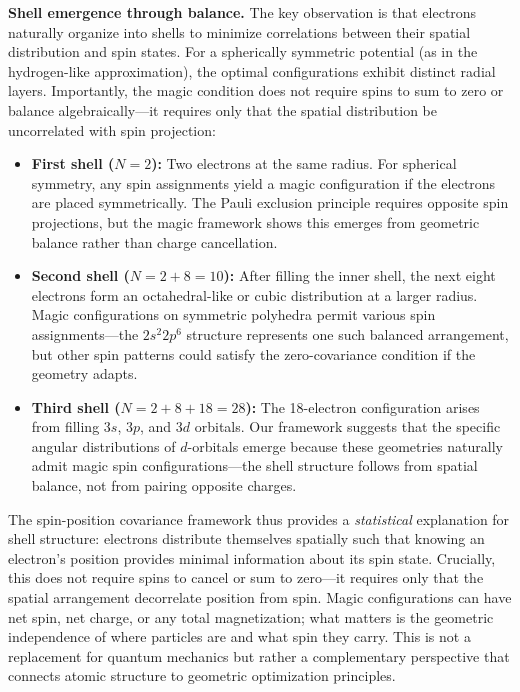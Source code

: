 \textbf{Shell emergence through balance.} The key observation is that electrons naturally organize into shells to minimize correlations between their spatial distribution and spin states. For a spherically symmetric potential (as in the hydrogen-like approximation), the optimal configurations exhibit distinct radial layers. Importantly, the magic condition does not require spins to sum to zero or balance algebraically---it requires only that the spatial distribution be uncorrelated with spin projection:

\begin{itemize}
\item \textbf{First shell ($N = 2$):} Two electrons at the same radius. For spherical symmetry, any spin assignments yield a magic configuration if the electrons are placed symmetrically. The Pauli exclusion principle requires opposite spin projections, but the magic framework shows this emerges from geometric balance rather than charge cancellation.

\item \textbf{Second shell ($N = 2 + 8 = 10$):} After filling the inner shell, the next eight electrons form an octahedral-like or cubic distribution at a larger radius. Magic configurations on symmetric polyhedra permit various spin assignments---the $2s^2 2p^6$ structure represents one such balanced arrangement, but other spin patterns could satisfy the zero-covariance condition if the geometry adapts.

\item \textbf{Third shell ($N = 2 + 8 + 18 = 28$):} The 18-electron configuration arises from filling $3s$, $3p$, and $3d$ orbitals. Our framework suggests that the specific angular distributions of $d$-orbitals emerge because these geometries naturally admit magic spin configurations---the shell structure follows from spatial balance, not from pairing opposite charges.
\end{itemize}

The spin-position covariance framework thus provides a \emph{statistical} explanation for shell structure: electrons distribute themselves spatially such that knowing an electron's position provides minimal information about its spin state. Crucially, this does not require spins to cancel or sum to zero---it requires only that the spatial arrangement decorrelate position from spin. Magic configurations can have net spin, net charge, or any total magnetization; what matters is the geometric independence of where particles are and what spin they carry. This is not a replacement for quantum mechanics but rather a complementary perspective that connects atomic structure to geometric optimization principles.

